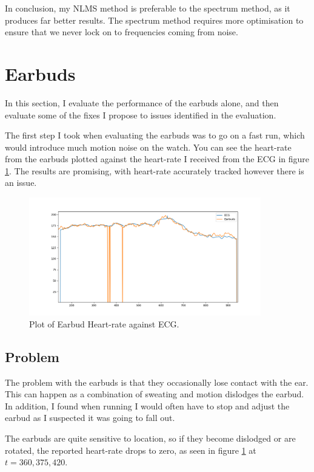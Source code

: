 \documentclass[12pt,a4paper,twoside,openany]{report}
\begin{document}
In conclusion, my NLMS method is preferable to the spectrum method, as it
produces far better results. The spectrum method requires more optimisation to
ensure that we never lock on to frequencies coming from noise.

\section{Earbuds}

In this section, I evaluate the performance of the earbuds alone, and then
evaluate some of the fixes I propose to issues identified in the evaluation.

The first step I took when evaluating the earbuds was to go on a fast run,
which would introduce much motion noise on the watch. You can see the
heart-rate from the earbuds plotted against the heart-rate I received from the
ECG in figure \ref{fig:earbud-fast}. The results are promising, with
heart-rate accurately tracked however there is an issue.

\begin{figure}[H]
	\centerline{\includegraphics[width=0.9\textwidth]{figs/earbud-fast-graph.png}}
	\caption{Plot of Earbud Heart-rate against ECG.}
	\label{fig:earbud-fast}
\end{figure}

\subsection{Problem} \label{sec:earbud-problem}

The problem with the earbuds is that they occasionally lose contact with the
ear. This can happen as a combination of sweating and motion dislodges the
earbud. In addition, I found when running I would often have to stop and
adjust the earbud as I suspected it was going to fall out. 

The earbuds are quite sensitive to location, so if they become dislodged or
are rotated, the reported heart-rate drops to zero, as seen in figure
\ref{fig:earbud-fast} at $t=360, 375, 420$.
\end{document}
